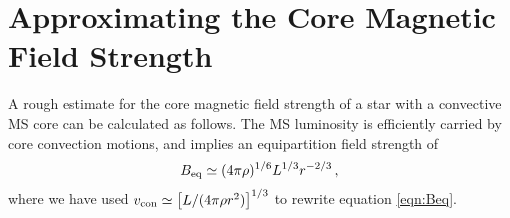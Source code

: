 \section{Approximating the Core Magnetic Field Strength}

A rough estimate for the core magnetic field strength of a star with a convective MS core can be calculated as follows. The MS luminosity is efficiently carried by core convection motions, and implies an equipartition field strength of 
\begin{equation}
\label{eqn:Beq2}
B_{\rm eq} \simeq (4 \pi \rho)^{1/6} L^{1/3} r^{-2/3} \, ,
\end{equation}
where we have used $v_{\rm con} \simeq \big[L/(4 \pi \rho r^2)\big]^{1/3}$ to rewrite equation \ref{eqn:Beq}. 